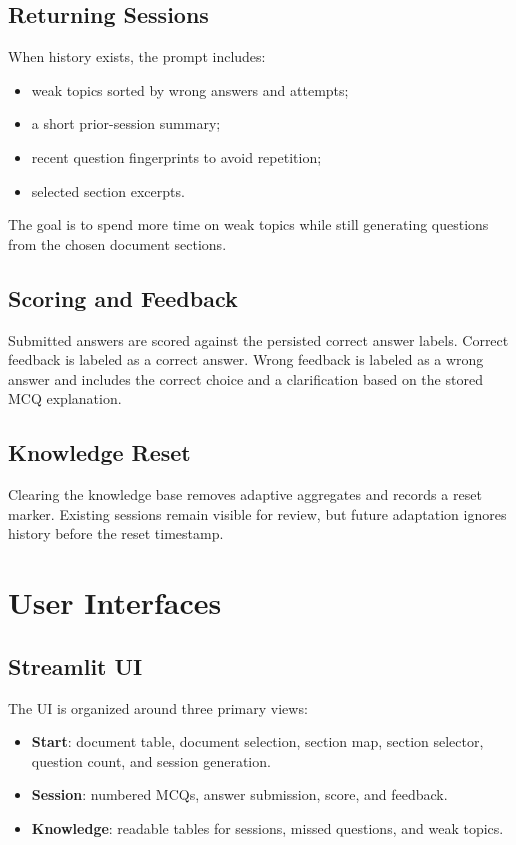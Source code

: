 \documentclass[11pt]{article}
\begin{document}
\subsection{Returning Sessions}

When history exists, the prompt includes:

\begin{itemize}
  \item weak topics sorted by wrong answers and attempts;
  \item a short prior-session summary;
  \item recent question fingerprints to avoid repetition;
  \item selected section excerpts.
\end{itemize}

The goal is to spend more time on weak topics while still generating questions from the chosen document sections.

\subsection{Scoring and Feedback}

Submitted answers are scored against the persisted correct answer labels. Correct feedback is labeled as a correct answer. Wrong feedback is labeled as a wrong answer and includes the correct choice and a clarification based on the stored MCQ explanation.

\subsection{Knowledge Reset}

Clearing the knowledge base removes adaptive aggregates and records a reset marker. Existing sessions remain visible for review, but future adaptation ignores history before the reset timestamp.

\section{User Interfaces}

\subsection{Streamlit UI}

The UI is organized around three primary views:

\begin{itemize}
  \item \textbf{Start}: document table, document selection, section map, section selector, question count, and session generation.
  \item \textbf{Session}: numbered MCQs, answer submission, score, and feedback.
  \item \textbf{Knowledge}: readable tables for sessions, missed questions, and weak topics.
\end{itemize}
\end{document}
